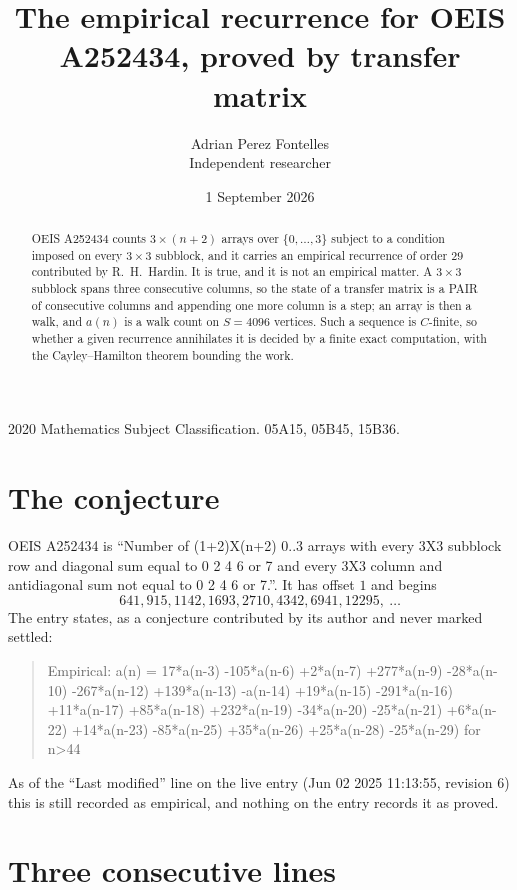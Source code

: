 \documentclass[11pt,a4paper]{article}
\title{The empirical recurrence for OEIS A252434, proved by transfer matrix}
\author{Adrian Perez Fontelles\\ \small Independent researcher}
\date{1 September 2026}
\theoremstyle{plain}
\theoremstyle{definition}
\begin{document}
\maketitle

\begin{abstract}
OEIS A252434 counts $3\times(n+2)$ arrays over $\{0,\dots,3\}$ subject to a condition imposed on
every $3\times3$ subblock, and it carries an empirical recurrence of order $29$
contributed by R.~H.~Hardin. It is true, and it is not an empirical matter. A $3\times3$
subblock spans three consecutive columns, so the state of a transfer matrix is a PAIR of
consecutive columns and appending one more column is a step; an array is then a walk, and
$a(n)$ is a walk count on $S=4096$ vertices. Such a sequence is $C$-finite, so whether a given
recurrence annihilates it is decided by a finite exact computation, with the Cayley--Hamilton
theorem bounding the work.
\end{abstract}

\noindent\small 2020 Mathematics Subject Classification. 05A15, 05B45, 15B36.\normalsize

\section{The conjecture}

OEIS A252434 is ``Number of (1+2)X(n+2) 0..3 arrays with every 3X3 subblock row and diagonal sum equal to 0 2 4 6 or 7 and every 3X3 column and antidiagonal sum not equal to 0 2 4 6 or 7.''. It has offset $1$ and begins
\[
641, 915, 1142, 1693, 2710, 4342, 6941, 12295,\ \dots
\]
The entry states, as a conjecture contributed by its author and never marked settled:
\begin{quote}
Empirical: a(n) = 17*a(n-3) -105*a(n-6) +2*a(n-7) +277*a(n-9) -28*a(n-10) -267*a(n-12) +139*a(n-13) -a(n-14) +19*a(n-15) -291*a(n-16) +11*a(n-17) +85*a(n-18) +232*a(n-19) -34*a(n-20) -25*a(n-21) +6*a(n-22) +14*a(n-23) -85*a(n-25) +35*a(n-26) +25*a(n-28) -25*a(n-29) for n>44
\end{quote}
As of the ``Last modified'' line on the live entry (Jun 02 2025 11:13:55, revision 6) this is still
recorded as empirical, and nothing on the entry records it as proved.

\section{Three consecutive lines}
\end{document}
